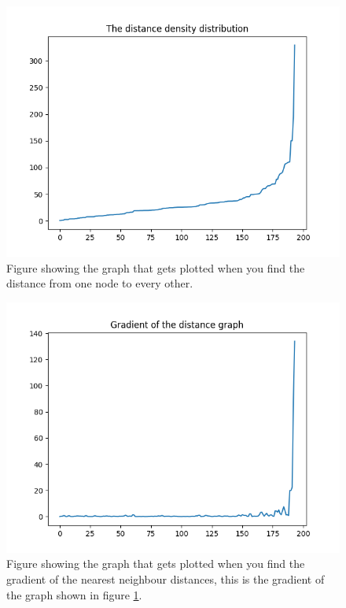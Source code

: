 \begin{figure}[h]
    \centering
    \includegraphics[width=\textwidth]{figures/eps_finder_graph_whole.png}
    \caption{Figure showing the graph that gets plotted when you find the distance from one node to every other.}
    \label{fig:whole_eps_graph}
\end{figure}

\begin{figure}[h]
    \centering
    \includegraphics[width=\textwidth]{figures/eps_finder_graph_gradient.png}
    \caption{Figure showing the graph that gets plotted when you find the gradient of the nearest neighbour distances, this is the gradient of the graph shown in figure \ref{fig:whole_eps_graph}.}
    \label{fig:gradient_eps_graph}
\end{figure}

